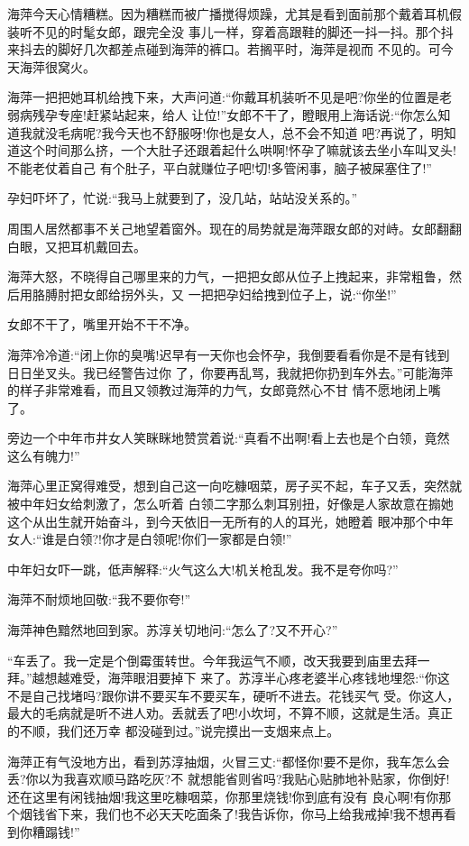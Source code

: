 \documentclass[11pt,a4paper,onecolumn]{article}
\begin{document}
海萍今天心情糟糕。因为糟糕而被广播搅得烦躁，尤其是看到面前那个戴着耳机假装听不见的时髦女郎，跟完全没
事儿一样，穿着高跟鞋的脚还一抖一抖。那个抖来抖去的脚好几次都差点碰到海萍的裤口。若搁平时，海萍是视而
不见的。可今天海萍很窝火。

海萍一把把她耳机给拽下来，大声问道:``你戴耳机装听不见是吧?你坐的位置是老弱病残孕专座!赶紧站起来，给人
让位!''女郎不干了，瞪眼用上海话说:``你怎么知道我就没毛病呢?我今天也不舒服呀!你也是女人，总不会不知道
吧?再说了，明知道这个时间那么挤，一个大肚子还跟着起什么哄啊!怀孕了嘛就该去坐小车叫叉头!不能老仗着自己
有个肚子，平白就赚位子吧!切!多管闲事，脑子被屎塞住了!''

孕妇吓坏了，忙说:``我马上就要到了，没几站，站站没关系的。''

周围人居然都事不关己地望着窗外。现在的局势就是海萍跟女郎的对峙。女郎翻翻白眼，又把耳机戴回去。

海萍大怒，不晓得自己哪里来的力气，一把把女郎从位子上拽起来，非常粗鲁，然后用胳膊肘把女郎给拐外头，又
一把把孕妇给拽到位子上，说:``你坐!''

女郎不干了，嘴里开始不干不净。

海萍冷冷道:``闭上你的臭嘴!迟早有一天你也会怀孕，我倒要看看你是不是有钱到日日坐叉头。我已经警告过你
了，你要再乱骂，我就把你扔到车外去。''可能海萍的样子非常难看，而且又领教过海萍的力气，女郎竟然心不甘
情不愿地闭上嘴了。

旁边一个中年市井女人笑眯眯地赞赏着说:``真看不出啊!看上去也是个白领，竟然这么有魄力!''

海萍心里正窝得难受，想到自己这一向吃糠咽菜，房子买不起，车子又丢，突然就被中年妇女给刺激了，怎么听着
白领二字那么刺耳别扭，好像是人家故意在搧她这个从出生就开始奋斗，到今天依旧一无所有的人的耳光，她瞪着
眼冲那个中年女人:``谁是白领?!你才是白领呢!你们一家都是白领!''

中年妇女吓一跳，低声解释:``火气这么大!机关枪乱发。我不是夸你吗?''

海萍不耐烦地回敬:``我不要你夸!''

海萍神色黯然地回到家。苏淳关切地问:``怎么了?又不开心?''

``车丢了。我一定是个倒霉蛋转世。今年我运气不顺，改天我要到庙里去拜一拜。''越想越难受，海萍眼泪要掉下
来了。苏淳半心疼老婆半心疼钱地埋怨:``你这不是自己找堵吗?跟你讲不要买车不要买车，硬听不进去。花钱买气
受。你这人，最大的毛病就是听不进人劝。丢就丢了吧!小坎坷，不算不顺，这就是生活。真正的不顺，我们还万幸
都没碰到过。''说完摸出一支烟来点上。

海萍正有气没地方出，看到苏淳抽烟，火冒三丈:``都怪你!要不是你，我车怎么会丢?你以为我喜欢顺马路吃灰?不
就想能省则省吗?我贴心贴肺地补贴家，你倒好!还在这里有闲钱抽烟!我这里吃糠咽菜，你那里烧钱!你到底有没有
良心啊!有你那个烟钱省下来，我们也不必天天吃面条了!我告诉你，你马上给我戒掉!我不想再看到你糟蹋钱!''
\end{document}

